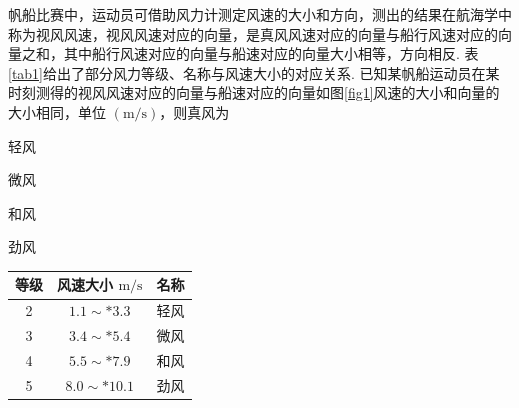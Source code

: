 \documentclass{exam-zh}
\begin{document}
\newpage
\begin{question}
  帆船比赛中，运动员可借助风力计测定风速的大小和方向，测出的结果在航海学中称为视风风速，视风风速对应的向量，是真风风速对应的向量与船行风速对应的向量之和，其中船行风速对应的向量与船速对应的向量大小相等，方向相反. 表\ref{tab1}给出了部分风力等级、名称与风速大小的对应关系. 已知某帆船运动员在某时刻测得的视风风速对应的向量与船速对应的向量如图\ref{fig1}风速的大小和向量的大小相同，单位 $(\mathrm{m} / \mathrm{s})$，则真风为 \paren
  \begin{choices}
    \item 轻风
    \item 微风
    \item 和风
    \item 劲风
  \end{choices}
  
\begin{minipage}[b]{0.4\linewidth}
  \centering
  \begin{tabular}{|c|c|c|}
    \hline
    等级 & 风速大小 $\mathrm{m}/\mathrm{s}$ & 名称 \\
    \hline
    2 & $1.1 \sim* 3.3$ & 轻风 \\
    \hline
    3 & $3.4 \sim* 5.4$ & 微风 \\
    \hline
    4 & $5.5 \sim* 7.9$ & 和风 \\
    \hline
    5 & $8.0 \sim* 10.1$ & 劲风 \\
    \hline
  \end{tabular}
  \label{tab1}
\end{minipage}
\hspace{2em}
\begin{minipage}[b]{0.4\linewidth}
  \centering
  \label{fig1}
\end{minipage}
\end{question}
\end{document}
